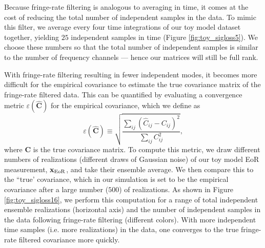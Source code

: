 \documentclass[preprint2,numberedappendix,tighten]{aastex6}  %
\newcommand{\C}{\mathbf{C}}
\newcommand{\Chat}{\mathbf{\widehat{C}}}
\newcommand{\cc}[1]{{\color{purple} \textbf{[CC: #1]}}}
\begin{document}
Because fringe-rate filtering is analogous to averaging in time, it comes at the cost of reducing the total number of independent samples in the data. To mimic this filter, we average every four time integrations of our toy model dataset together, yielding $25$ independent samples in time (Figure \ref{fig:toy_sigloss5}). We choose these numbers so that the total number of independent samples is similar to the number of frequency channels --- hence our matrices will still be full rank.

With fringe-rate filtering resulting in fewer independent modes, it becomes more difficult for the empirical covariance to estimate the true covariance matrix of the fringe-rate filtered data. This can be quantified by evaluating a convergence metric $\varepsilon(\Chat)$ for the empirical covariance, which we define as
\begin{equation}
\label{eq:converge}
\varepsilon (\Chat) \equiv \sqrt{\frac{\sum_{ij} (\widehat{C}_{ij} - {C}_{ij})^2}{\sum_{ij} {C}_{ij}^2}},
\end{equation}
where $\C$ is the true covariance matrix. To compute this metric, we draw different numbers of realizations (different draws of Gaussian noise) of our toy model EoR measurement, $\textbf{x}_{\rm EoR}$, and take their ensemble average. We then compare this to the ``true' covariance, which in our simulation is set to be the empirical covariance after a large number ($500$) of realizations. As shown in Figure \ref{fig:toy_sigloss16}, we perform this computation for a range of total independent ensemble realizations (horizontal axis) and the number of independent samples in the data following fringe-rate filtering (different colors). With more independent time samples (i.e. more realizations) in the data, one converges to the true fringe-rate filtered covariance more quickly. 
\end{document}
